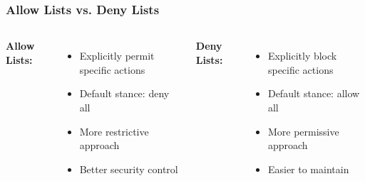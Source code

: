 \documentclass{beamer}
\begin{document}
            \begin{frame}
            \frametitle{Allow Lists vs. Deny Lists}
            \begin{columns}[t]
            \textbf{Allow Lists:}
            \begin{itemize}
                \item Explicitly permit specific actions
                \item Default stance: deny all
                \item More restrictive approach
                \item Better security control
            \end{itemize}
            \textbf{Deny Lists:}
            \begin{itemize}
                \item Explicitly block specific actions
                \item Default stance: allow all
                \item More permissive approach
                \item Easier to maintain
            \end{itemize}
            \end{columns}
            \end{frame}
            
\end{document}
